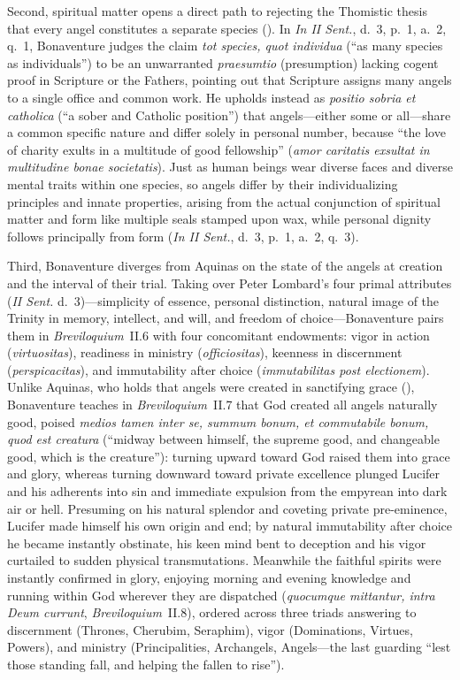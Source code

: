 Second, spiritual matter opens a direct path to rejecting the Thomistic thesis that every angel constitutes a separate species (). In \emph{In II Sent.}, d.~3, p.~1, a.~2, q.~1, Bonaventure judges the claim \emph{tot species, quot individua} (``as many species as individuals'') to be an unwarranted \emph{praesumtio} (presumption) lacking cogent proof in Scripture or the Fathers, pointing out that Scripture assigns many angels to a single office and common work. He upholds instead as \emph{positio sobria et catholica} (``a sober and Catholic position'') that angels---either some or all---share a common specific nature and differ solely in personal number, because ``the love of charity exults in a multitude of good fellowship'' (\emph{amor caritatis exsultat in multitudine bonae societatis}). Just as human beings wear diverse faces and diverse mental traits within one species, so angels differ by their individualizing principles and innate properties, arising from the actual conjunction of spiritual matter and form like multiple seals stamped upon wax, while personal dignity follows principally from form (\emph{In II Sent.}, d.~3, p.~1, a.~2, q.~3).

Third, Bonaventure diverges from Aquinas on the state of the angels at creation and the interval of their trial. Taking over Peter Lombard's four primal attributes (\emph{II Sent.} d.~3)---simplicity of essence, personal distinction, natural image of the Trinity in memory, intellect, and will, and freedom of choice---Bonaventure pairs them in \emph{Breviloquium}~II.6 with four concomitant endowments: vigor in action (\emph{virtuositas}), readiness in ministry (\emph{officiositas}), keenness in discernment (\emph{perspicacitas}), and immutability after choice (\emph{immutabilitas post electionem}). Unlike Aquinas, who holds that angels were created in sanctifying grace (), Bonaventure teaches in \emph{Breviloquium}~II.7 that God created all angels naturally good, poised \emph{medios tamen inter se, summum bonum, et commutabile bonum, quod est creatura} (``midway between himself, the supreme good, and changeable good, which is the creature''): turning upward toward God raised them into grace and glory, whereas turning downward toward private excellence plunged Lucifer and his adherents into sin and immediate expulsion from the empyrean into dark air or hell. Presuming on his natural splendor and coveting private pre-eminence, Lucifer made himself his own origin and end; by natural immutability after choice he became instantly obstinate, his keen mind bent to deception and his vigor curtailed to sudden physical transmutations. Meanwhile the faithful spirits were instantly confirmed in glory, enjoying morning and evening knowledge and running within God wherever they are dispatched (\emph{quocumque mittantur, intra Deum currunt}, \emph{Breviloquium}~II.8), ordered across three triads answering to discernment (Thrones, Cherubim, Seraphim), vigor (Dominations, Virtues, Powers), and ministry (Principalities, Archangels, Angels---the last guarding ``lest those standing fall, and helping the fallen to rise'').

